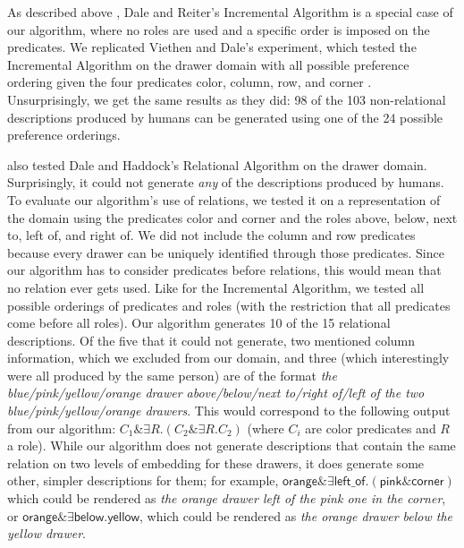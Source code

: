 As described above , Dale and Reiter's
Incremental Algorithm is a special case of our algorithm, where no
roles are used and a specific order is imposed on the predicates. We
replicated Viethen and Dale's experiment, which tested the Incremental
Algorithm on the drawer domain with all possible preference ordering
given the four predicates
\textsf{color, column, row}, and \textsf{corner}
\cite{viethen06:_algor_for_gener_refer_expres}.  Unsurprisingly, we
get the same results as they did: 98 of the 103 non-relational
descriptions produced by humans can be generated using one of the 24
possible preference orderings.

 also tested Dale and
Haddock's 
Relational Algorithm on the drawer domain. Surprisingly, it could not
generate \textit{any} of the descriptions produced by humans. To
evaluate our algorithm's use of relations, we tested it on a
representation of the domain using the predicates \textsf{color} and
\textsf{corner} and the roles \textsf{above, below, next to, left of},
and \textsf{right of}. We did not include the \textsf{column} and
\textsf{row} predicates because every drawer can be uniquely
identified through those predicates. Since our algorithm has to
consider predicates before relations, this would mean that no relation
ever gets used. Like for the Incremental Algorithm, we tested all
possible orderings of predicates and roles (with the restriction that
all predicates come before all roles). Our algorithm generates 10 of
the 15 relational descriptions. Of the five that it could not
generate, two mentioned column information, which we excluded from our
domain, and three (which interestingly were all produced by the same
person) are of the format \textit{the blue/pink/yellow/orange drawer
above/below/next to/right of/left of the two blue/pink/yellow/orange
drawers}. This would correspond to the following output from our
algorithm: $C_1 \& \exists R . (C_2 \& \exists R . C_2)$ (where $C_i$
are color predicates and $R$ a role). While our algorithm does not
generate descriptions that contain the same relation on two levels of
embedding for these drawers, it does generate some other, simpler
descriptions for them; for example, $\textsf{orange} \& \exists
\textsf{left\_of} . (\textsf{pink}
\& \textsf{corner})$ which could be rendered as
\textit{the orange drawer left of the pink one in the corner}, or
$\textsf{orange} \& \exists \textsf{below} . \textsf{yellow}$,
which could be rendered as \textit{the orange drawer below the yellow
drawer}.

